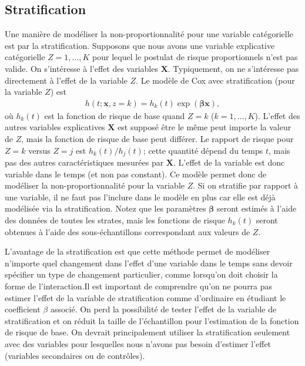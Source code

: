 \documentclass[
  11pt,
  letterpaper,
]{scrbook}
\theoremstyle{definition}
\theoremstyle{remark}
\begin{document}
\subsection{Stratification}\label{stratification}

Une manière de modéliser la non-proportionnalité pour une variable
catégorielle est par la stratification. Supposons que nous avons une
variable explicative catégorielle \(Z=1, \ldots, K\) pour lequel le
postulat de risque proportionnels n'est pas valide. On s'intéresse à
l'effet des variables \(\mathbf{X}\). Typiquement, on ne s'intéresse pas
directement à l'effet de la variable \(Z\). Le modèle de Cox avec
stratification (pour la variable \(Z\)) est \begin{align*}
h(t; \mathbf{x}, z=k) = h_k(t) \exp(\boldsymbol{\beta} \mathbf{x}),
\end{align*} où \(h_k(t)\) est la fonction de risque de base quand
\(Z=k\) (\(k=1, \ldots, K\)). L'effet des autres variables explicatives
\(\mathbf{X}\) est supposé être le même peut importe la valeur de \(Z\),
mais la fonction de risque de base peut différer. Le rapport de risque
pour \(Z=k\) versus \(Z=j\) est \(h_k(t)/h_j(t)\); cette quantité dépend
du temps \(t\), mais pas des autres caractéristiques mesurées par
\(\mathbf{X}\). L'effet de la variable est donc variable dans le temps
(et non pas constant). Ce modèle permet donc de modéliser la
non-proportionnalité pour la variable \(Z\). Si on stratifie par rapport
à une variable, il ne faut pas l'inclure dans le modèle en plus car elle
est déjà modélisée via la stratification. Notez que les paramètres
\(\boldsymbol{\beta}\) seront estimés à l'aide des données de toutes les
strates, mais les fonctions de risque \(h_k(t)\) seront obtenues à
l'aide des sous-échantillons correspondant aux valeurs de \(Z\).

L'avantage de la stratification est que cette méthode permet de
modéliser n'importe quel changement dans l'effet d'une variable dans le
temps sans devoir spécifier un type de changement particulier, comme
lorsqu'on doit choisir la forme de l'interaction.Il est important de
comprendre qu'on ne pourra pas estimer l'effet de la variable de
stratification comme d'ordinaire en étudiant le coefficient \(\beta\)
associé. On perd la possibilité de tester l'effet de la variable de
stratification et on réduit la taille de l'échantillon pour l'estimation
de la fonction de risque de base. On devrait principalement utiliser la
stratification seulement avec des variables pour lesquelles nous n'avons
pas besoin d'estimer l'effet (variables secondaires ou de contrôles).
\end{document}

